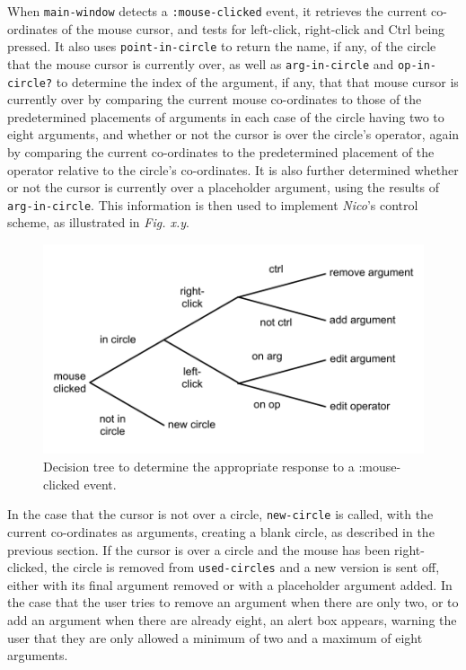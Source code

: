 \documentclass[12pt,twoside,notitlepage,xetex]{report}
\begin{document}
When \verb¬main-window¬ detects a \verb¬:mouse-clicked¬ event, it retrieves the
current co-ordinates of the mouse cursor, and tests for left-click, right-click
and Ctrl being pressed.  It also uses \verb¬point-in-circle¬ to return the
name, if any, of the circle that the mouse cursor is currently over, as well
as \verb¬arg-in-circle¬ and \verb¬op-in-circle?¬ to determine the index of the
argument, if any, that that mouse cursor is currently over by comparing the
current mouse co-ordinates to those of the predetermined placements of
arguments in each case of the circle having two to eight arguments, and whether
or not the cursor is over the circle's operator, again by comparing the current
co-ordinates to the predetermined placement of the operator relative to the
circle's co-ordinates.  It is also further determined whether or not the cursor
is currently over a placeholder argument, using the results of
\verb¬arg-in-circle¬.  This information is then used to implement \emph{Nico}'s
control scheme, as illustrated in \emph{Fig. x.y}.

\begin{center}
\begin{figure}[H]
\begin{center}
\includegraphics[width=\textwidth-4cm]{figs/nico_click.pdf}
\end{center}
\caption{Decision tree to determine the appropriate response to a {\ttfamily :mouse-clicked} event.}
\end{figure}
\end{center}

In the case that the cursor is not over a circle, \verb¬new-circle¬ is called,
with the current co-ordinates as arguments, creating a blank circle, as
described in the previous section.  If the cursor is over a circle and the
mouse has been right-clicked, the circle is removed from \verb¬used-circles¬
and a new version is sent off, either with its final argument removed or with a
placeholder argument added.  In the case that the user tries to remove an
argument when there are only two, or to add an argument when there are already
eight, an alert box appears, warning the user that they are only allowed a
minimum of two and a maximum of eight arguments.
\end{document}
